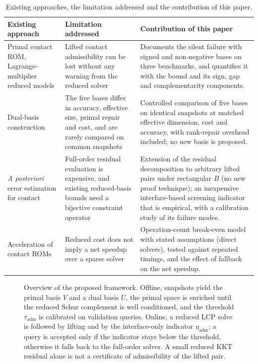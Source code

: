 \documentclass[11pt,a4paper]{article}
\begin{document}
\begin{table}[htbp]
\centering
\small
\caption{Existing approaches, the limitation addressed and the contribution of this paper.}
\label{tab:contrib}
\begin{tabular}{@{}p{}p{}p{}@{}}
\toprule
Existing approach & Limitation addressed & Contribution of this paper \\
\midrule
Primal contact ROM, Lagrange-multiplier reduced models \cite{balajewicz2016projection, benaceur2020reduced, leberre2022condition} & Lifted contact admissibility can be lost without any warning from the reduced solver & Documents the silent failure with signed and non-negative bases on three benchmarks, and quantifies it with the bound and its sign, gap and complementarity components. \\
Dual-basis construction \cite{balajewicz2016projection, benaceur2020reduced, sambataro2026model, fauque2018hybrid} & The five bases differ in accuracy, effective size, primal repair and cost, and are rarely compared on common snapshots & Controlled comparison of five bases on identical snapshots at matched effective dimension, cost and accuracy, with rank-repair overhead included; no new basis is proposed. \\
\emph{A posteriori} error estimation for contact \cite{hild2007residual, banz2024generic, zhang2014duality} & Full-order residual evaluation is expensive, and existing reduced-basis bounds need a bijective constraint operator & Extension of the residual decomposition to arbitrary lifted pairs under rectangular $B$ (no new proof technique); an inexpensive interface-based screening indicator that is empirical, with a calibration study of its failure modes. \\
Acceleration of contact ROMs \cite{koller2021hyper, aresdeparga2023petrov, pawar2025efficient} & Reduced cost does not imply a net speedup over a sparse solver & Operation-count break-even model with stated assumptions (direct solvers), tested against repeated timings, and the effect of fallback on the net speedup. \\
\bottomrule
\end{tabular}
\end{table}

\begin{figure}[htbp]
\centering

\caption{Overview of the proposed framework. Offline, snapshots yield the primal basis $V$ and a dual basis $U$, the primal space is enriched until the reduced Schur complement is well conditioned, and the threshold $\tau_{\mathrm{adm}}$ is calibrated on validation queries. Online, a reduced LCP solve is followed by lifting and by the interface-only indicator $\eta_{\mathrm{adm}}$; a query is accepted only if the indicator stays below the threshold, otherwise it falls back to the full-order solver. A small reduced KKT residual alone is not a certificate of admissibility of the lifted pair.}
\label{fig:workflow}
\end{figure}
\end{document}

